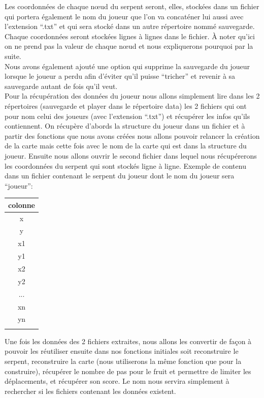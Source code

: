 \documentclass{article}
\begin{document}
Les coordonnées de chaque nœud du serpent seront, elles, stockées dans un fichier qui portera également le nom du joueur que l’on va concaténer lui aussi avec l’extension “.txt” et qui sera stocké dans un autre répertoire nommé sauvegarde. Chaque coordonnées seront stockées lignes à lignes dans le fichier. À noter qu’ici on ne prend pas la valeur de chaque nœud et nous expliquerons pourquoi par la suite.\\[0.5cm]


Nous avons également ajouté une option qui supprime la sauvegarde du joueur lorsque le joueur a perdu afin d’éviter qu’il puisse “tricher” et revenir à sa sauvegarde autant de fois qu’il veut.\\[0.5cm]

Pour la récupération des données du joueur nous allons simplement lire dans les 2 répertoires (sauvegarde et player dans le répertoire data) les 2 fichiers qui ont pour nom celui des joueurs (avec l’extension “.txt”) et récupérer les infos qu’ils contiennent. On récupère d’abords la structure du joueur dans un fichier et à partir des fonctions que nous avons créées nous allons pouvoir relancer la création de la carte mais cette fois avec le nom de la carte qui est dans la structure du joueur. Ensuite nous allons ouvrir le second fichier dans lequel nous récupérerons les coordonnées du serpent qui sont stockés ligne à ligne. Exemple de contenu dans un fichier contenant le serpent du joueur dont le nom du joueur sera “joueur”:\\[0.5cm]
\begin{center}
\begin{tabular}{|c|}
  \hline
  colonne \\
  \hline
  x\\[0.1cm]
  y\\[0.1cm]
  x1\\[0.1cm]
  y1\\[0.1cm]
  x2\\[0.1cm]
  y2\\[0.1cm]
  ...\\[0.1cm]
  xn\\[0.1cm]
  yn\\[0.1cm]
  \\
  \hline
\end{tabular}
\end{center}
Une fois les données des 2 fichiers extraites, nous allons les convertir de façon à pouvoir les réutiliser ensuite dans nos fonctions initiales soit reconstruire le serpent, reconstruire la carte (nous utiliserons la même fonction que pour la construire), récupérer le nombre de pas pour le fruit et permettre de limiter les déplacements, et récupérer son score. Le nom nous servira simplement à rechercher si les fichiers contenant les données existent.\\[0.5cm]
\end{document}
